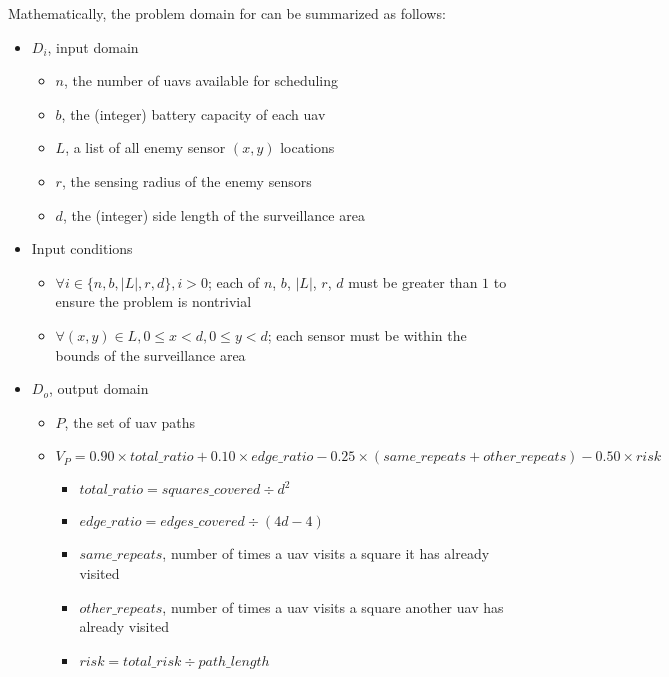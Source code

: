 \documentclass[../main.tex]{subfiles}
\begin{document}
Mathematically, the problem domain for \probs can be summarized as follows:

\begin{itemize}
    \item $D_i$, input domain

    \begin{itemize}
        \item $n$, the number of \acp{uav} available for scheduling
        \item $b$, the (integer) battery capacity of each \ac{uav}
        \item $L$, a list of all enemy sensor $(x,y)$ locations
        \item $r$, the sensing radius of the enemy sensors
        \item $d$, the (integer) side length of the surveillance area
    \end{itemize}
    
    \item Input conditions
    \begin{itemize}
        \item $\forall i\in \{n,b,|L|,r,d\}, i>0$; each of $n$, $b$, $|L|$, $r$, $d$ must be greater than $1$ to ensure the problem is nontrivial
        \item $\forall(x,y)\in L, 0\leq x<d, 0\leq y<d$; each sensor must be within the bounds of the surveillance area
    \end{itemize}
    
    \item $D_o$, output domain
    \begin{itemize}
        \item $P$, the set of \ac{uav} paths

        \item $V_P=0.90\times total\_ratio + 0.10\times edge\_ratio - 0.25\times (same\_repeats + other\_repeats) - 0.50\times risk$
        \begin{itemize}
            \item $total\_ratio=squares\_covered\div d^2$
            \item $edge\_ratio=edges\_covered\div (4d-4)$
            \item $same\_repeats$, number of times a \ac{uav} visits a square it has already visited
            \item $other\_repeats$, number of times a \ac{uav} visits a square another \ac{uav} has already visited
            \item $risk=total\_risk\div path\_length$
        \end{itemize}
    \end{itemize}
    

\end{itemize}
\end{document}
